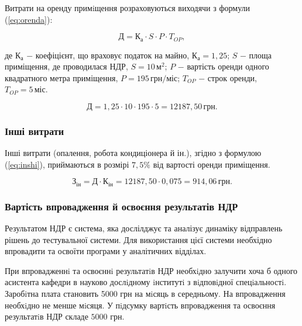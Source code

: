 Витрати на оренду примiщення розраховуються виходячи з формули (\ref{eq:orenda}):

\begin{equation}\label{eq:orenda}
\text{Д} = \text{К}_{\text{а}} \cdot S \cdot P \cdot T_{OP},
\end{equation}

\noindent де $\text{К}_{\text{а}}$ $-$ коефіцієнт, що враховує податок на майно, $\text{К}_{\text{а}} = 1,25$;\newline
\hspace*{19pt}$S$ $-$ площа приміщення, де проводилася НДР, $S = 10 \, \text{м}^{2}$;\newline
\hspace*{19pt}$P$ $-$ вартість оренди одного квадратного метра приміщення, $P = 195 \, \text{грн}/\text{міс}$;\newline
\hspace*{19pt}$T_{OP}$ $-$ строк оренди, $T_{OP} = 5 \, \text{міс}$.

\[
\text{Д} = 1,25 \cdot 10 \cdot 195 \cdot 5 = 12187,50 \, \text{грн}.
\]

\vspace{1.5em}

\subsubsection{Інші витрати}

Інші витрати (опалення, робота кондиціонера й ін.), згідно з формулою (\ref{eq:inshi}), приймаються в розмірі $7,5\%$ від вартості оренди приміщення. 

\begin{equation}\label{eq:inshi}
\text{З}_{\text{ін}} = \text{Д} \cdot \text{К}_{\text{ін}} = 12187,50 \cdot 0,075 = 914,06 \, \text{грн}. 
\end{equation}

\vspace{1.5em}

\subsubsection{Вартість впровадження й освоєння результатів НДР}

Результатом НДР є система, яка дослілджує та аналізує динаміку відправлень рішень до тестувальної системи. Для використання цієї системи необхідно впровадити та освоїти програми у аналітичних відділах.

При впровадженнi та освоєннi результатiв НДР необхiдно залучити хоча б одного асистента кафедри в науково дослiдному iнститутi з вiдповiдної спецiальностi. Заробiтна плата становить 5000 грн на мiсяць в середньому. На впровадження необхiдно не менше мiсяця. У пiдсумку вартiсть впровадження та освоєння результатiв НДР складе $5000$ грн.

